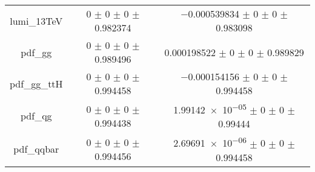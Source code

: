 \begin{table}
\begin{tabular}{ccc}
lumi\_13TeV & \num{0} $\pm$ \num{0} $\pm$ \num{0} $\pm$ \num{0.982374} & \num{-0.000539834} $\pm$ \num{0} $\pm$ \num{0} $\pm$ \num{0.983098}\\
pdf\_gg & \num{0} $\pm$ \num{0} $\pm$ \num{0} $\pm$ \num{0.989496} & \num{0.000198522} $\pm$ \num{0} $\pm$ \num{0} $\pm$ \num{0.989829}\\
pdf\_gg\_ttH & \num{0} $\pm$ \num{0} $\pm$ \num{0} $\pm$ \num{0.994458} & \num{-0.000154156} $\pm$ \num{0} $\pm$ \num{0} $\pm$ \num{0.994458}\\
pdf\_qg & \num{0} $\pm$ \num{0} $\pm$ \num{0} $\pm$ \num{0.994438} & \num{1.99142e-05} $\pm$ \num{0} $\pm$ \num{0} $\pm$ \num{0.99444}\\
pdf\_qqbar & \num{0} $\pm$ \num{0} $\pm$ \num{0} $\pm$ \num{0.994456} & \num{2.69691e-06} $\pm$ \num{0} $\pm$ \num{0} $\pm$ \num{0.994458}\\
\bottomrule
\end{tabular}
\end{table}
